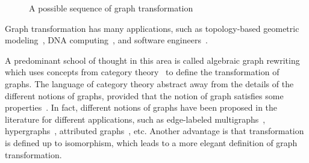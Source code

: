 \begin{figure}
{
}
        \caption{A possible sequence of graph transformation}
        \label{fig:intro_sequence_of_transformation}
    \end{figure}

 Graph transformation has many applications, such as topology-based geometric modeling~\cite{poudret2007topology, belhaouari2014jerboa, bellet2017geometric, pascale2022Geometric_modeling}, DNA computing~\cite{harju2004tutorial_dna_computation}, and software engineers~\cite{heckel2020software_engineers}.
 
 A predominant school of thought in this area is called algebraic graph rewriting~\cite{ehrig1997handbook1,ehrig1999handbook2,ehrig1999handbook3} which uses concepts from category theory~\cite{pierce1991basic,barr1990category,maclane2013categories} to define the transformation of graphs. The language of category theory abstract away from the details of the different notions of graphs, provided that the notion of graph satisfies some properties~\cite{lack2004adhesive,overbeek2023graph}. 
 In fact, different notions of graphs have been proposed in the literature for different applications, such as edge-labeled multigraphs~\cite{konig2018atutorial,corradini1997algebraic}, hypergraphs~\cite{plump1993hypergraph}, attributed graphs~\cite{ehrig2006fundamentals}, etc. Another advantage is that transformation is defined up to isomorphism, which leads to a more elegant definition of graph transformation.

